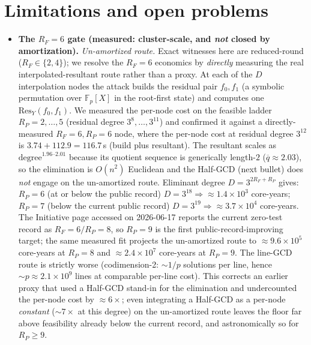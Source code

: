 \documentclass[11pt]{article}
\newcommand{\Fp}{\mathbb{F}_p}
\newcommand{\RF}{R_F}
\newcommand{\RP}{R_P}
\theoremstyle{plain}
\begin{document}
\section{Limitations and open problems}\label{sec:limits}
\begin{itemize}
\item \textbf{The $\RF=6$ gate (measured: cluster-scale, and \emph{not} closed by amortization).} \emph{Un-amortized route.} Exact witnesses here are reduced-round ($\RF\in\{2,4\}$);
we resolve the $\RF=6$ economics by \emph{directly} measuring the real
interpolated-resultant route rather than a proxy. At each of the $D$ interpolation
nodes the attack builds the residual pair $f_0,f_1$ (a symbolic permutation over
$\Fp[X]$ in the root-first state) and computes one $\mathrm{Res}_Y(f_0,f_1)$. We
measured the per-node cost on the feasible ladder $\RP=2,\dots,5$ (residual degree
$3^{8},\dots,3^{11}$) and confirmed it against a directly-measured $\RF=6,\RP=6$
node, where the per-node cost at residual degree $3^{12}$ is
$3.74+112.9=116.7$\,s (build plus resultant). The resultant scales as
$\text{degree}^{1.96\text{--}2.01}$ because its quotient sequence is generically
length-$2$ ($\overline{q}\approx 2.03$), so the elimination is $O(n^2)$ Euclidean
and the Half-GCD (next bullet) does \emph{not} engage on the un-amortized route.
Eliminant degree $D=3^{2\RF+\RP}$ gives: $\RP=6$ (at or below the public record)
$D=3^{18}\Rightarrow \approx 1.4\times10^3$ core-years; $\RP=7$ (below the
current public record) $D=3^{19}\Rightarrow \approx 3.7\times10^4$ core-years.
The Initiative page accessed on 2026-06-17 reports the current zero-test record as
$\RF=6/\RP=8$, so $\RP=9$ is the first public-record-improving target; the same
measured fit projects the un-amortized route to $\approx 9.6\times10^5$ core-years
at $\RP=8$ and $\approx 2.4\times10^7$ core-years at $\RP=9$. The line-GCD route is
strictly worse (codimension-2: $\sim 1/p$ solutions per line, hence $\sim p\approx
2.1\times10^9$ lines at comparable per-line cost). This corrects an earlier proxy
that used a Half-GCD stand-in for the elimination and undercounted the per-node
cost by $\approx 6\times$; even integrating a Half-GCD as a per-node \emph{constant} ($\sim 7\times$ at this
degree) on the un-amortized route leaves the floor far above feasibility already
below the current record, and astronomically so for $\RP\ge 9$.


\end{itemize}
\end{document}
